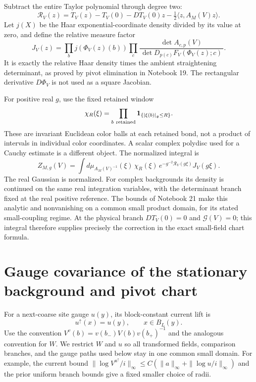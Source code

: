 \documentclass[11pt]{article}
\theoremstyle{remark}
\begin{document}
Subtract the entire Taylor polynomial through degree two:
\begin{equation}\label{gc-taylor-remainder}
 \mathcal R_V(z)=T_V(z)-T_V(0)-DT_V(0)z
                           -\tfrac12\langle z,A_M(V)z\rangle.
\end{equation}
Let $j(X)$ be the Haar exponential-coordinate density divided by
its value at zero, and define the relative measure factor
\begin{equation}\label{gc-density}
 J_V(z)=
 \prod_b j(\Phi_V(z)(b))
 \prod_c\frac{\det A_{c,p}(V)}
 {\,\det D_{p(c)}F_V(\Phi_V(z);c)\,}.
\end{equation}
It is exactly the relative Haar density times the ambient
straightening determinant, as proved by pivot elimination in
Notebook 19. The rectangular derivative $D\Phi_V$ is not used as a
square Jacobian.

For positive real $g$, use the fixed retained window
\begin{equation}\label{gc-cutoff}
 \chi_R(\xi)=\prod_{b\ {\rm retained}}
                    \mathbf1_{\{|\xi(b)|_{\mathfrak g}\le R\}}.
\end{equation}
These are invariant Euclidean color balls at each retained bond,
not a product of intervals in individual color coordinates. A scalar
complex polydisc used for a Cauchy estimate is a different object.
The normalized integral is
\begin{equation}\label{gc-normalized-integral}
 Z_{M,g}(V)=\int d\mu_{A_M(V)^{-1}}(\xi)\,
      \chi_R(\xi)\,
      e^{-g^{-2}\mathcal R_V(g\xi)}J_V(g\xi).
\end{equation}
The real Gaussian is normalized. For complex backgrounds its density
is continued on the same real integration variables, with the
determinant branch fixed at the real positive reference. The bounds
of Notebook 21 make this analytic and nonvanishing on a common
small product domain, for its stated small-coupling regime.
At the physical branch $DT_V(0)=0$ and $\mathscr G(V)=0$; this
integral therefore supplies precisely the correction in the exact
small-field chart formula.

\section{Gauge covariance of the stationary background and pivot chart}
\label{gc-covariance}

For a next-coarse site gauge $u(y)$, its block-constant current lift is
\begin{equation}\label{gc-block-lift}
 u^\uparrow(x)=u(y),\qquad x\in B_L(y).
\end{equation}
Use the convention
$V^v(b)=v(b_-)V(b)v(b_+)^{-1}$ and the analogous convention for $W$.
We restrict $W$ and $u$ so all transformed fields, comparison branches,
and the gauge paths used below stay in one common small domain.
For example, the current bound
$\|\log V^{u^\uparrow}/i\|_\infty\le
C(\|a\|_\infty+\|\log u/i\|_\infty)$ and the prior uniform
branch bounds give a fixed smaller choice of radii.
\end{document}
